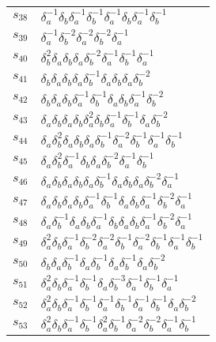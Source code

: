\documentclass{article}
\begin{document}
\begin{center}
\begin{tabular}{ll}
$s_{38}$ & $\delta_a^{-1}\delta_b^{}\delta_a^{-1}\delta_b^{-1}\delta_a^{-1}\delta_b^{}\delta_a^{-1}\delta_b^{-1}$ \\
$s_{39}$ & $\delta_a^{-1}\delta_b^{-2}\delta_a^{-2}\delta_b^{-2}\delta_a^{-1}$ \\
$s_{40}$ & $\delta_b^{2}\delta_a^{}\delta_b^{}\delta_a^{}\delta_b^{-2}\delta_a^{-1}\delta_b^{-1}\delta_a^{-1}$ \\
$s_{41}$ & $\delta_b^{}\delta_a^{}\delta_b^{}\delta_a^{}\delta_b^{-1}\delta_a^{}\delta_b^{}\delta_a^{}\delta_b^{-2}$ \\
$s_{42}$ & $\delta_b^{}\delta_a^{}\delta_b^{}\delta_a^{-1}\delta_b^{-1}\delta_a^{}\delta_b^{}\delta_a^{-1}\delta_b^{-2}$ \\
$s_{43}$ & $\delta_a^{}\delta_b^{}\delta_a^{}\delta_b^{}\delta_a^{2}\delta_b^{}\delta_a^{-1}\delta_b^{-1}\delta_a^{}\delta_b^{-2}$ \\
$s_{44}$ & $\delta_a^{}\delta_b^{2}\delta_a^{}\delta_b^{}\delta_a^{}\delta_b^{-1}\delta_a^{-2}\delta_b^{-1}\delta_a^{-1}\delta_b^{-1}$ \\
$s_{45}$ & $\delta_a^{}\delta_b^{2}\delta_a^{-1}\delta_b^{}\delta_a^{}\delta_b^{-2}\delta_a^{-1}\delta_b^{-1}$ \\
$s_{46}$ & $\delta_a^{}\delta_b^{}\delta_a^{}\delta_b^{}\delta_a^{}\delta_b^{-1}\delta_a^{}\delta_b^{}\delta_a^{}\delta_b^{-2}\delta_a^{-1}$ \\
$s_{47}$ & $\delta_a^{}\delta_b^{}\delta_a^{}\delta_b^{}\delta_a^{-1}\delta_b^{-1}\delta_a^{}\delta_b^{}\delta_a^{-1}\delta_b^{-2}\delta_a^{-1}$ \\
$s_{48}$ & $\delta_a^{}\delta_b^{-1}\delta_a^{}\delta_b^{}\delta_a^{-1}\delta_b^{}\delta_a^{}\delta_b^{}\delta_a^{-1}\delta_b^{-2}\delta_a^{-1}$ \\
$s_{49}$ & $\delta_a^{2}\delta_b^{}\delta_a^{-1}\delta_b^{-2}\delta_a^{-2}\delta_b^{-1}\delta_a^{-2}\delta_b^{-1}\delta_a^{-1}\delta_b^{-1}$ \\
$s_{50}$ & $\delta_b^{}\delta_a^{}\delta_b^{-1}\delta_a^{}\delta_b^{-1}\delta_a^{}\delta_b^{-1}\delta_a^{}\delta_b^{-2}$ \\
$s_{51}$ & $\delta_a^{2}\delta_b^{}\delta_a^{-1}\delta_b^{-1}\delta_a^{}\delta_b^{-3}\delta_a^{-1}\delta_b^{-1}\delta_a^{-1}$ \\
$s_{52}$ & $\delta_a^{2}\delta_b^{}\delta_a^{-1}\delta_b^{-1}\delta_a^{-1}\delta_b^{-1}\delta_a^{-1}\delta_b^{-1}\delta_a^{}\delta_b^{-2}$ \\
$s_{53}$ & $\delta_a^{2}\delta_b^{}\delta_a^{-1}\delta_b^{-1}\delta_a^{2}\delta_b^{-1}\delta_a^{-2}\delta_b^{-2}\delta_a^{-1}\delta_b^{-1}$ \\

\end{tabular}
\end{center}
\end{document}

